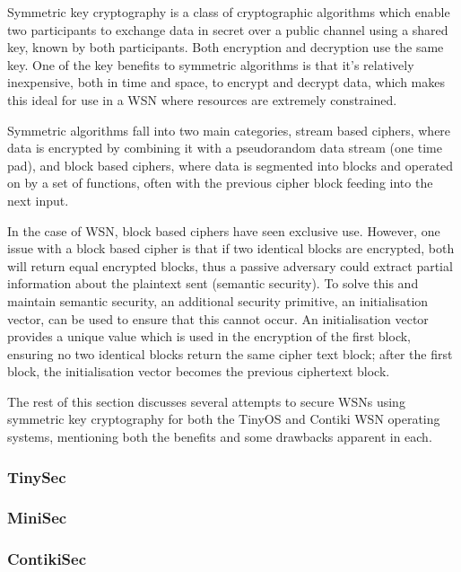\documentclass{mprop}
\begin{document}
Symmetric key cryptography is a class of cryptographic algorithms which enable two participants to exchange data in secret over a public channel using a shared key, known by both participants. Both encryption and decryption use the same key. One of the key benefits to symmetric algorithms is that it's relatively inexpensive, both in time and space, to encrypt and decrypt data, which makes this ideal for use in a WSN where resources are extremely constrained.

Symmetric algorithms fall into two main categories, stream based ciphers, where data is encrypted by combining it with a pseudorandom data stream (one time pad), and block based ciphers, where data is segmented into blocks and operated on by a set of functions, often with the previous cipher block feeding into the next input. 

In the case of WSN, block based ciphers have seen exclusive use. However, one issue with a block based cipher is that if two identical blocks are encrypted, both will return equal encrypted blocks, thus a passive adversary could extract partial information about the plaintext sent (semantic security). To solve this and maintain semantic security, an additional security primitive, an initialisation vector, can be used to ensure that this cannot occur. An initialisation vector provides a unique value which is used in the encryption of the first block, ensuring no two identical blocks return the same cipher text block; after the first block, the initialisation vector becomes the previous ciphertext block.

The rest of this section discusses several attempts to secure WSNs using symmetric key cryptography for both the TinyOS and Contiki WSN operating systems, mentioning both the benefits and some drawbacks apparent in each. 


\subsubsection{TinySec} %
\label{ssub:tinysec}


\subsubsection{MiniSec} %
\label{ssub:minisec}


\subsubsection{ContikiSec} %
\label{ssub:contikisec}

\end{document}
